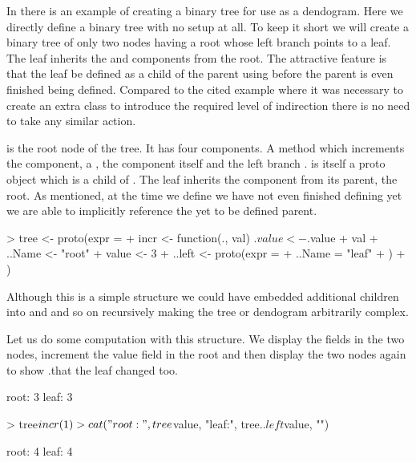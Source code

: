 \documentclass{Z}
\begin{document}
In \cite{Gentleman2002} there is an 
example of creating a binary tree
for use as a dendogram.  Here we directly define a binary tree with no
setup at all.  To keep it short we will create a binary tree of only
two nodes having a root whose left branch points to a leaf.  The leaf
inherits the  and  components from the root.
The attractive feature is that the leaf be defined as a child of the
parent using  before the parent is even finished
being defined.  Compared to the cited  example where it
was necessary to create an extra class to introduce the required level of
indirection there is no need to take any similar action.

 is the root node of the tree.  It has four components.  A
method  which increments the  component, a
, the  component itself and the left branch
.   is itself a proto object which is a
child of .  The leaf inherits the  component
from its parent, the root.  As mentioned, at the time we define
 we have not even finished defining  yet we
are able to implicitly reference the yet to be defined parent.

\begin{Schunk}
\begin{Sinput}
> tree <- proto(expr = {
+     incr <- function(., val) .$value <- .$value + val
+     ..Name <- "root"
+     value <- 3
+     ..left <- proto(expr = {
+         ..Name = "leaf"
+     })
+ })
\end{Sinput}
\end{Schunk}

Although this is a simple structure we could have embedded additional
children into  and  and so on recursively making
the tree or dendogram arbitrarily complex.

Let us do some computation with this structure.  We display the
 fields in the two nodes, increment the value field in the
root and then display the two nodes again to show .that the leaf
changed too.

\begin{Schunk}
\begin{Soutput}
root: 3 leaf: 3 
\end{Soutput}
\begin{Sinput}
> tree$incr(1)
> cat("root:", tree$value, "leaf:", tree$..left$value, "\n")
\end{Sinput}
\begin{Soutput}
root: 4 leaf: 4 
\end{Soutput}
\end{Schunk}
\end{document}
